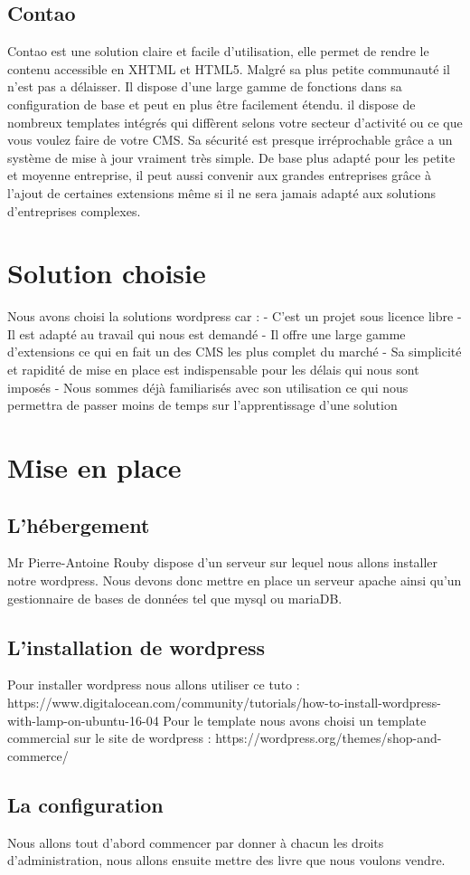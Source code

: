 \documentclass[a4paper,12pt]{report}
\begin{document}
\section{Contao}

Contao est une solution claire et facile d'utilisation, elle permet de
rendre le contenu accessible en XHTML et HTML5. Malgré sa plus petite
communauté il n'est pas a délaisser.  Il dispose d'une large gamme de
fonctions dans sa configuration de base et peut en plus être
facilement étendu. il dispose de nombreux templates intégrés qui
diffèrent selons votre secteur d'activité ou ce que vous voulez faire
de votre CMS.  Sa sécurité est presque irréprochable grâce a un
système de mise à jour vraiment très simple. De base plus adapté pour
les petite et moyenne entreprise, il peut aussi convenir aux grandes
entreprises grâce à l'ajout de certaines extensions même si il ne sera
jamais adapté aux solutions d'entreprises complexes.

\chapter{Solution choisie}

Nous avons choisi la solutions wordpress car : - C'est un projet sous
licence libre - Il est adapté au travail qui nous est demandé - Il
offre une large gamme d’extensions ce qui en fait un des CMS les plus
complet du marché - Sa simplicité et rapidité de mise en place est
indispensable pour les délais qui nous sont imposés - Nous sommes déjà
familiarisés avec son utilisation ce qui nous permettra de passer
moins de temps sur l'apprentissage d'une solution

\chapter{Mise en place}
\section{L'hébergement}

Mr Pierre-Antoine Rouby dispose d'un serveur sur lequel nous allons
installer notre wordpress. Nous devons donc mettre en place un serveur
apache ainsi qu'un gestionnaire de bases de données tel que mysql ou
mariaDB.

\section{L'installation de wordpress}

Pour installer wordpress nous allons utiliser ce tuto :
https://www.digitalocean.com/community/tutorials/how-to-install-wordpress-with-lamp-on-ubuntu-16-04
Pour le template nous avons choisi un template commercial sur le site
de wordpress : https://wordpress.org/themes/shop-and-commerce/

\section{La configuration}

Nous allons tout d'abord commencer par donner à chacun les droits
d'administration, nous allons ensuite mettre des livre que nous
voulons vendre.
\end{document}
